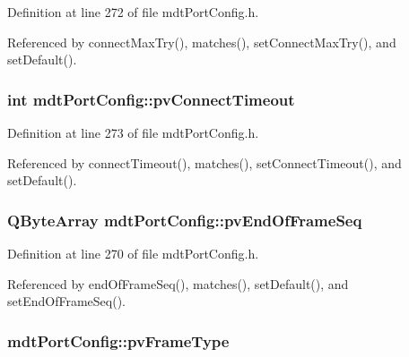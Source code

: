 Definition at line 272 of file mdt\-Port\-Config.\-h.



Referenced by connect\-Max\-Try(), matches(), set\-Connect\-Max\-Try(), and set\-Default().

\hypertarget{classmdt_port_config_a3e6aa49486e716f834e174b5ce0a3909}{
\subsubsection[{pv\-Connect\-Timeout}]{\setlength{\rightskip}{0pt plus 5cm}int mdt\-Port\-Config\-::pv\-Connect\-Timeout\hspace{0.3cm}{\ttfamily [protected]}}}\label{classmdt_port_config_a3e6aa49486e716f834e174b5ce0a3909}


Definition at line 273 of file mdt\-Port\-Config.\-h.



Referenced by connect\-Timeout(), matches(), set\-Connect\-Timeout(), and set\-Default().

\hypertarget{classmdt_port_config_ad5d5aeb26cfe98090848a62f5078b22c}{
\subsubsection[{pv\-End\-Of\-Frame\-Seq}]{\setlength{\rightskip}{0pt plus 5cm}Q\-Byte\-Array mdt\-Port\-Config\-::pv\-End\-Of\-Frame\-Seq\hspace{0.3cm}{\ttfamily [protected]}}}\label{classmdt_port_config_ad5d5aeb26cfe98090848a62f5078b22c}


Definition at line 270 of file mdt\-Port\-Config.\-h.



Referenced by end\-Of\-Frame\-Seq(), matches(), set\-Default(), and set\-End\-Of\-Frame\-Seq().

\hypertarget{classmdt_port_config_a4bc3110b7831ca76954a8d8fc78944f1}{
\subsubsection[{pv\-Frame\-Type}]{ mdt\-Port\-Config\-::pv\-Frame\-Type\hspace{0.3cm}{\ttfamily [protected]}}}\label{classmdt_port_config_a4bc3110b7831ca76954a8d8fc78944f1}


